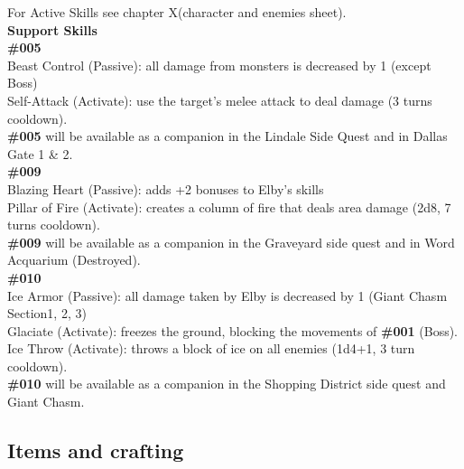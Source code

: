 For Active Skills see chapter X(character and enemies sheet).\\

\textbf{Support Skills}\\

\textbf{\#005}\\
Beast Control (Passive): all damage from monsters is decreased by 1 (except Boss)\\
Self-Attack (Activate): use the target's melee attack to deal damage (3 turns cooldown).\\
\textbf{\#005} will be available as a companion in the Lindale Side Quest and in Dallas Gate 1 \& 2.\\

\textbf{\#009}\\
Blazing Heart (Passive): adds +2 bonuses to Elby's skills\\
Pillar of Fire (Activate): creates a column of fire that deals area damage (2d8, 7 turns cooldown).\\
\textbf{\#009} will be available as a companion in the Graveyard side quest and in Word Acquarium (Destroyed).\\

\textbf{\#010}\\
Ice Armor (Passive): all damage taken by Elby is decreased by 1 (Giant Chasm Section1, 2, 3)\\
Glaciate (Activate): freezes the ground, blocking the movements of \textbf{\#001} (Boss).\\
Ice Throw (Activate): throws a block of ice on all enemies (1d4+1, 3 turn cooldown).\\
\textbf{\#010} will be available as a companion in the Shopping District side quest and Giant Chasm.

\newpage

\subsection{Items and crafting}

